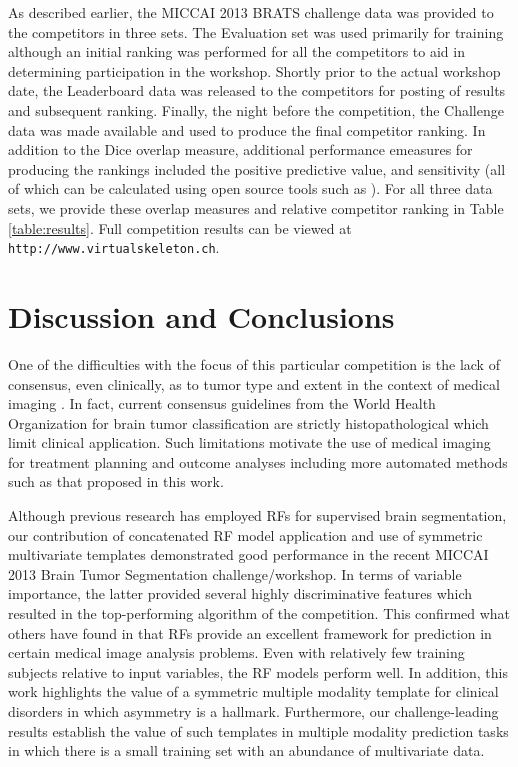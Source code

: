 \documentclass[preprint,authoryear,review,12pt]{elsarticle}
\begin{document}
As described earlier, the MICCAI 2013 BRATS challenge data was provided to the
competitors in three sets.  The Evaluation set was used primarily for training
although an initial ranking was performed for all the competitors to aid in
determining participation in the workshop.  Shortly prior to the actual workshop
date, the Leaderboard data was released to the competitors for posting of results
and subsequent ranking.  Finally, the night before the competition, the Challenge
data was made available and used to produce the final competitor ranking.  In addition
to the Dice overlap measure, additional performance emeasures for producing the rankings 
included the positive predictive value, and sensitivity (all of which can be calculated
using open source tools such as \cite{tustison2009}).  
For all three data sets, we provide these overlap measures and relative competitor 
ranking in Table \ref{table:results}.  Full competition results can be viewed
at {\tt http://www.virtualskeleton.ch}.

\section{Discussion and Conclusions} 

One of the difficulties with the focus of this particular competition 
is the lack of consensus, even clinically, as to tumor type and extent
in the context of medical imaging \citep{cha2005}.  In fact, current 
consensus guidelines from the World Health Organization for brain 
tumor classification are strictly histopathological \citep{louis2007}
which limit clinical application.  Such limitations motivate the
use of medical imaging for treatment planning and outcome analyses 
\citep{cha2005} including more automated methods such as that proposed
in this work.

Although previous research has employed RFs for supervised brain
segmentation, our contribution of concatenated RF model application and use
of symmetric multivariate templates demonstrated good performance 
in the recent MICCAI 2013 Brain Tumor Segmentation challenge/workshop.  
In terms of variable importance, the latter provided several highly 
discriminative features which resulted in the top-performing algorithm 
of the competition.  This confirmed what others have found in that
RFs provide an excellent framework for prediction in certain
medical image analysis problems.  Even with relatively few training
subjects relative to input variables, the RF models
perform well.
In addition, this work highlights the value of  a symmetric multiple
modality template for clinical disorders in which asymmetry is a
hallmark.  Furthermore, our challenge-leading results establish the
value of such templates in multiple modality prediction
tasks in which there is a small training set with an abundance of
multivariate data.
\end{document}
